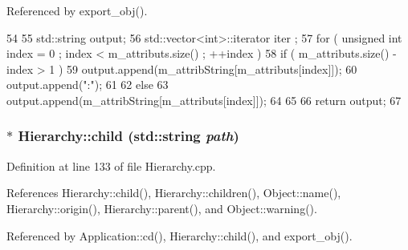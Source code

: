 Referenced by export\_\-obj().


\begin{DoxyCode}
54                             {
55   std::string output;
56   std::vector<int>::iterator iter ;
57   for ( unsigned int index = 0 ; index < m_attributs.size() ; ++index ) {
58     if ( m_attributs.size() - index > 1 ) {
59       output.append(m_attribString[m_attributs[index]]);
60       output.append(":");
61     }
62     else {
63       output.append(m_attribString[m_attributs[index]]);
64     }
65   }
66   return output;
67 }
\end{DoxyCode}
\hypertarget{classHierarchy_a1e207f973c694b538bf90107b4868817}{
\subsubsection[{child}]{ $\ast$ Hierarchy::child (std::string {\em path})}}
\label{classHierarchy_a1e207f973c694b538bf90107b4868817}


Definition at line 133 of file Hierarchy.cpp.

References Hierarchy::child(), Hierarchy::children(), Object::name(), Hierarchy::origin(), Hierarchy::parent(), and Object::warning().

Referenced by Application::cd(), Hierarchy::child(), and export\_\-obj().


